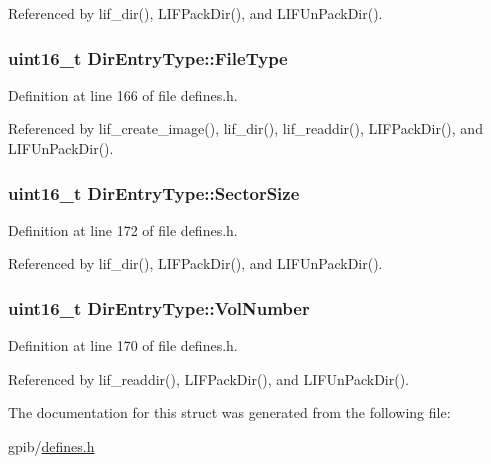 Referenced by lif\+\_\+dir(), L\+I\+F\+Pack\+Dir(), and L\+I\+F\+Un\+Pack\+Dir().

\subsubsection[{\texorpdfstring{File\+Type}{FileType}}]{\setlength{\rightskip}{0pt plus 5cm}uint16\+\_\+t Dir\+Entry\+Type\+::\+File\+Type}\hypertarget{structDirEntryType_a97b6ddc8d198c32bf4a29c4784ab7188}{}\label{structDirEntryType_a97b6ddc8d198c32bf4a29c4784ab7188}


Definition at line 166 of file defines.\+h.



Referenced by lif\+\_\+create\+\_\+image(), lif\+\_\+dir(), lif\+\_\+readdir(), L\+I\+F\+Pack\+Dir(), and L\+I\+F\+Un\+Pack\+Dir().

\subsubsection[{\texorpdfstring{Sector\+Size}{SectorSize}}]{\setlength{\rightskip}{0pt plus 5cm}uint16\+\_\+t Dir\+Entry\+Type\+::\+Sector\+Size}\hypertarget{structDirEntryType_ab92ab53cd08e0ffe0f0098c583ce5eba}{}\label{structDirEntryType_ab92ab53cd08e0ffe0f0098c583ce5eba}


Definition at line 172 of file defines.\+h.



Referenced by lif\+\_\+dir(), L\+I\+F\+Pack\+Dir(), and L\+I\+F\+Un\+Pack\+Dir().

\subsubsection[{\texorpdfstring{Vol\+Number}{VolNumber}}]{\setlength{\rightskip}{0pt plus 5cm}uint16\+\_\+t Dir\+Entry\+Type\+::\+Vol\+Number}\hypertarget{structDirEntryType_a2fe2eefd68aafcce0bb14bf53e4cba00}{}\label{structDirEntryType_a2fe2eefd68aafcce0bb14bf53e4cba00}


Definition at line 170 of file defines.\+h.



Referenced by lif\+\_\+readdir(), L\+I\+F\+Pack\+Dir(), and L\+I\+F\+Un\+Pack\+Dir().



The documentation for this struct was generated from the following file\+:\begin{DoxyCompactItemize}
\item 
gpib/\hyperlink{defines_8h}{defines.\+h}\end{DoxyCompactItemize}
